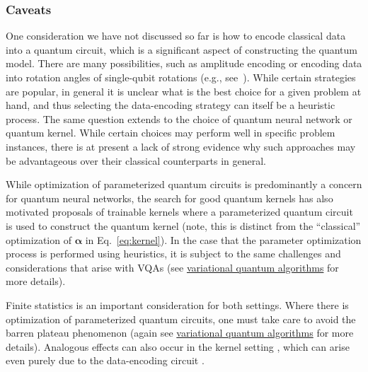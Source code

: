 \begin{refsection}
\subsubsection*{Caveats}

One consideration we have not discussed so far is how to encode classical data into a quantum circuit, which is a significant aspect of constructing the quantum model. There are many possibilities, such as amplitude encoding or encoding data into rotation angles of single-qubit rotations (e.g., see~\cite{lloyd2020quantumembeddings, havlivcek2019supervisedlearning, hubregtsen2021trainingKernels, laRose2020robustencodings}). While certain strategies are popular, in general it is unclear what is the best choice for a given problem at hand, and thus selecting the data-encoding strategy can itself be a heuristic process. The same question extends to the choice of quantum neural network or quantum kernel. While certain choices may perform well in specific problem instances, there is at present a lack of strong evidence why such approaches may be advantageous over their classical counterparts in general. 

While optimization of parameterized quantum circuits is predominantly a concern for quantum neural networks, the search for good quantum kernels has also motivated proposals of trainable kernels \cite{hubregtsen2021trainingKernels, gentinetta2023KernelAlignmentSGD, glick2021CovariantKernels} where a parameterized quantum circuit is used to construct the quantum kernel (note, this is distinct from the ``classical'' optimization of $\boldsymbol{\alpha}$ in Eq.~\eqref{eq:kernel}). In the case that the parameter optimization process is performed using heuristics, it is subject to the same challenges and considerations that arise with VQAs (see \hyperref[prim:VQA]{variational quantum algorithms} for more details). 

Finite statistics is an important consideration for both settings. Where there is optimization of parameterized quantum circuits, one must take care to avoid the barren plateau phenomenon \cite{mcclean2018barrenplateau, cerezo2020costfunctionbp, holmes2021connectingexpressibility, marrero2020entanglement, sharma2020trainability} (again see \hyperref[prim:VQA]{variational quantum algorithms} for more details). Analogous effects can also occur in the kernel setting \cite{kubler2021inductive}, which can arise even purely due to the data-encoding circuit \cite{huang2021power, thanasilp2022exponential}.


\end{refsection}

